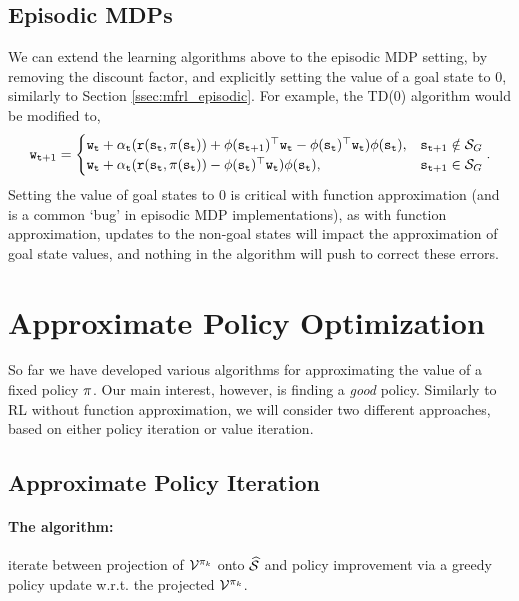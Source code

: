 \subsection{Episodic MDPs}

We can extend the learning algorithms above to the  episodic MDP setting, by removing the discount factor, and explicitly setting the value of a goal state to $0$, similarly to Section \ref{ssec:mfrl_episodic}. For example, the TD(0) algorithm would be modified to,
\begin{equation*}\label{eq:TD_func_approx_ssp}
    {\tt w}_{{\tt t}+1} = \begin{cases}
        {\tt w}_{\tt t} + \alpha_{\tt t} ( {\tt r}({\tt s}_{\tt t},\pi({\tt s}_{\tt t})) +{\phi}({\tt s}_{{\tt t}+1})^\top {\tt w}_{\tt t} - {\phi}({\tt s}_{{\tt t}})^\top {\tt w}_{\tt t}) \phi({\tt s}_{{\tt t}}), & {\tt s}_{{\tt t}+1} \notin \mathcal{S}_G \\
        {\tt w}_{\tt t} + \alpha_{\tt t} ( {\tt r}({\tt s}_{\tt t},\pi({\tt s}_{\tt t})) - {\phi}({\tt s}_{{\tt t}})^\top {\tt w}_{\tt t}) \phi({\tt s}_{{\tt t}}), & {\tt s}_{{\tt t}+1} \in \mathcal{S}_G
    \end{cases}.
\end{equation*}
Setting the value of goal states to $0$ is critical with function approximation (and is a common `bug' in episodic MDP implementations), as with function approximation, updates to the non-goal states will impact the approximation of goal state values, and  nothing in the algorithm will push to correct these errors.

\section{Approximate Policy Optimization}

So far we have developed various algorithms for approximating the value of a fixed policy $\pi$. Our main interest, however, is finding a \textit{good} policy. Similarly to RL without function approximation, we will consider two different approaches, based on either policy iteration or value iteration.

\subsection{Approximate Policy Iteration}

\paragraph{The algorithm:} iterate between projection of $\mathcal{V}^{\pi_k}$ onto $\widehat{\mathcal{S}}$ and policy improvement via a greedy policy update w.r.t. the projected $\mathcal{V}^{\pi_k}$.


